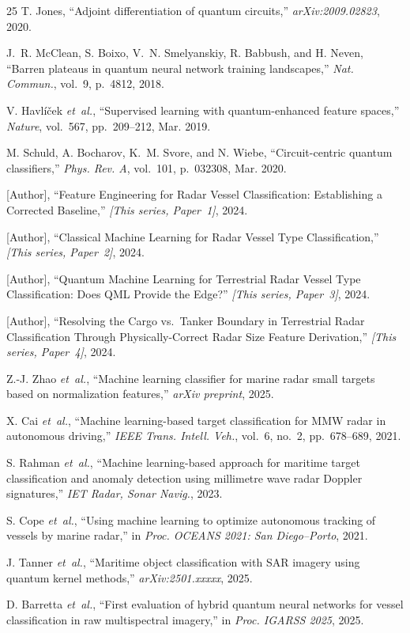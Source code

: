 \documentclass[journal]{IEEEtran}
\begin{document}
\begin{thebibliography}{25}
T. Jones,
``Adjoint differentiation of quantum circuits,''
\textit{arXiv:2009.02823}, 2020.

J.~R. McClean, S. Boixo, V.~N. Smelyanskiy, R. Babbush, and H. Neven,
``Barren plateaus in quantum neural network training landscapes,''
\textit{Nat. Commun.}, vol.~9, p.~4812, 2018.

V. Havl{\'i}{\v{c}}ek \textit{et~al.},
``Supervised learning with quantum-enhanced feature spaces,''
\textit{Nature}, vol.~567, pp.~209--212, Mar. 2019.

M. Schuld, A. Bocharov, K.~M. Svore, and N. Wiebe,
``Circuit-centric quantum classifiers,''
\textit{Phys. Rev. A}, vol.~101, p.~032308, Mar. 2020.

[Author], ``Feature Engineering for Radar Vessel Classification:
Establishing a Corrected Baseline,'' \textit{[This series, Paper~1]},
2024.

[Author], ``Classical Machine Learning for Radar Vessel Type
Classification,'' \textit{[This series, Paper~2]}, 2024.

[Author], ``Quantum Machine Learning for Terrestrial Radar Vessel Type
Classification: Does QML Provide the Edge?''
\textit{[This series, Paper~3]}, 2024.

[Author], ``Resolving the Cargo vs.\ Tanker Boundary in Terrestrial Radar
Classification Through Physically-Correct Radar Size Feature Derivation,''
\textit{[This series, Paper~4]}, 2024.

Z.-J. Zhao \textit{et~al.},
``Machine learning classifier for marine radar small targets based on
normalization features,'' \textit{arXiv preprint}, 2025.

X. Cai \textit{et~al.},
``Machine learning-based target classification for MMW radar in autonomous
driving,'' \textit{IEEE Trans. Intell. Veh.}, vol.~6, no.~2,
pp.~678--689, 2021.

S. Rahman \textit{et~al.},
``Machine learning-based approach for maritime target classification and
anomaly detection using millimetre wave radar Doppler signatures,''
\textit{IET Radar, Sonar Navig.}, 2023.

S. Cope \textit{et~al.},
``Using machine learning to optimize autonomous tracking of vessels by
marine radar,'' in \textit{Proc. OCEANS 2021: San Diego--Porto}, 2021.

J. Tanner \textit{et~al.},
``Maritime object classification with SAR imagery using quantum kernel
methods,'' \textit{arXiv:2501.xxxxx}, 2025.

D. Barretta \textit{et~al.},
``First evaluation of hybrid quantum neural networks for vessel
classification in raw multispectral imagery,''
in \textit{Proc. IGARSS 2025}, 2025.

\end{thebibliography}
\end{document}
